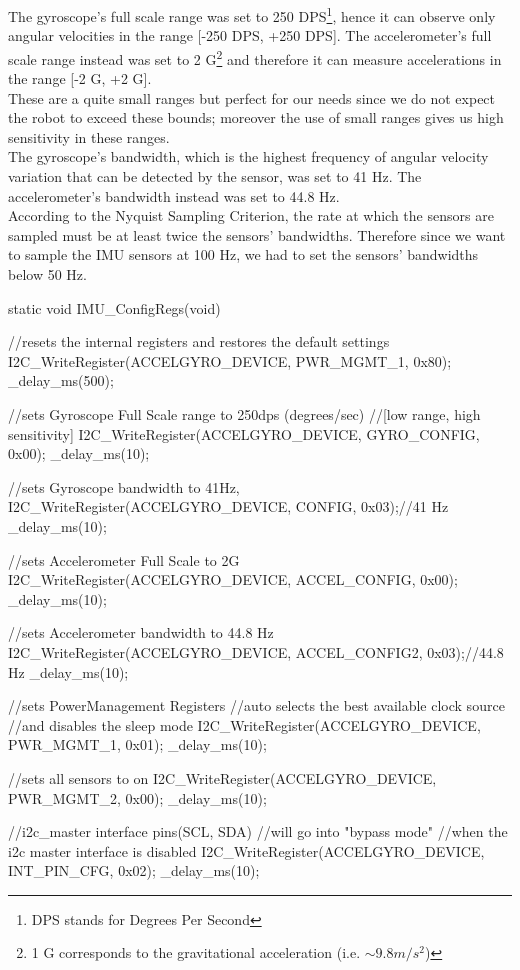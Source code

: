 The gyroscope's full scale range was set to 250 DPS\footnote{DPS stands for Degrees Per Second}, hence it can observe only angular velocities in the range [-250 DPS, +250 DPS]. The accelerometer's full scale range instead was set to 2 G\footnote{1 G corresponds to the gravitational acceleration (i.e. $\sim 9.8 m/s^2$)} and therefore it can measure accelerations in the range [-2 G, +2 G].\\These are a quite small ranges but perfect for our needs since we do not expect the robot to exceed these bounds; moreover the use of small ranges gives us high sensitivity in these ranges.\\

The gyroscope's bandwidth, which is the highest frequency of angular velocity variation that can be detected by the sensor, was set to 41 Hz. The accelerometer's bandwidth instead was set to 44.8 Hz.\\According to the Nyquist Sampling Criterion, the rate at which the sensors are sampled must be at least twice the sensors' bandwidths. Therefore since we want to sample the IMU sensors at 100 Hz, we had to set the sensors' bandwidths below 50 Hz.
\begin{ccode}
	static void IMU_ConfigRegs(void) {
		//resets the internal registers and restores the default settings
		I2C_WriteRegister(ACCELGYRO_DEVICE, PWR_MGMT_1, 0x80);
		_delay_ms(500);
		
		//sets Gyroscope Full Scale range to 250dps (degrees/sec)
			//[low range, high sensitivity]
		I2C_WriteRegister(ACCELGYRO_DEVICE, GYRO_CONFIG, 0x00);
		_delay_ms(10);
	
		//sets Gyroscope bandwidth to 41Hz,
		I2C_WriteRegister(ACCELGYRO_DEVICE, CONFIG, 0x03);//41 Hz
		_delay_ms(10);
	
		//sets Accelerometer Full Scale to 2G
		I2C_WriteRegister(ACCELGYRO_DEVICE, ACCEL_CONFIG, 0x00);
		_delay_ms(10);
		
		//sets Accelerometer bandwidth to 44.8 Hz
		I2C_WriteRegister(ACCELGYRO_DEVICE, ACCEL_CONFIG2, 0x03);//44.8 Hz
		_delay_ms(10);

		//sets PowerManagement Registers
			//auto selects the best available clock source
			//and disables the sleep mode
		I2C_WriteRegister(ACCELGYRO_DEVICE, PWR_MGMT_1, 0x01);
		_delay_ms(10);
		
		//sets all sensors to on
		I2C_WriteRegister(ACCELGYRO_DEVICE, PWR_MGMT_2, 0x00);
		_delay_ms(10);
	
		//i2c_master interface pins(SCL, SDA)
			//will go into "bypass mode"
			//when the i2c master interface is disabled
		I2C_WriteRegister(ACCELGYRO_DEVICE, INT_PIN_CFG, 0x02);
		_delay_ms(10);
	}
\end{ccode}

